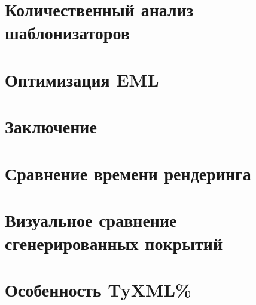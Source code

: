 \newpage
\section{Количественный анализ шаблонизаторов}


\newpage
\section{Оптимизация EML}


\newpage
\section*{Заключение}





\appendix
{}
\section{Сравнение времени рендеринга}


\section{Визуальное сравнение сгенерированных покрытий}
\label{apx:coverage}


\section{Особенность TyXML\%}
\label{apx:tyxml_performance}




